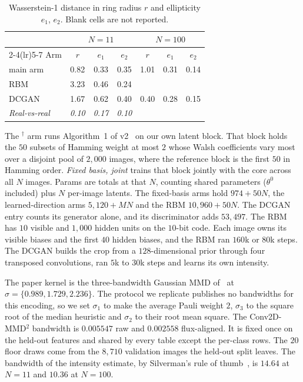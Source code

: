 \documentclass{article}
\begin{document}
\label{app:arms}
\begin{table}
\vspace{-10pt}
\centering
\caption{Wasserstein-1 distance in ring radius $r$ and ellipticity $e_1$, $e_2$. Blank cells
are not reported.}
\label{tab:w1}
\scriptsize
\setlength{\tabcolsep}{3pt}
\begin{tabular}{lcccccc}
\toprule
& \multicolumn{3}{c}{$N = 11$} & \multicolumn{3}{c}{$N = 100$} \\
\cmidrule(lr){2-4}\cmidrule(lr){5-7}
Arm & $r$ & $e_1$ & $e_2$ & $r$ & $e_1$ & $e_2$ \\
\midrule
main arm & 0.82 & 0.33 & 0.35 & 1.01 & 0.31 & 0.14 \\
RBM & 3.23 & 0.46 & 0.24 & & & \\
DCGAN & 1.67 & 0.62 & 0.40 & 0.40 & 0.28 & 0.15 \\
\textit{Real-vs-real} & \textit{0.10} & \textit{0.17} & \textit{0.10} & & & \\
\bottomrule
\end{tabular}
\vspace{-8pt}
\end{table}
The $^{\dagger}$ arm runs Algorithm~1 of v2~\cite{liu_2026_correlation} on our own latent block.
That block holds the $50$ subsets of Hamming weight at most $2$ whose Walsh coefficients vary most
over a disjoint pool of $2{,}000$ images, where the reference block is the first $50$ in Hamming
order. \emph{Fixed basis, joint} trains that block jointly with the core across all $N$ images.
Params are totals at that $N$, counting shared parameters ($\theta^{0}$ included) plus $N$
per-image latents. The fixed-basis arms hold $974 + 50N$, the learned-direction arms
$5{,}120 + MN$ and the RBM $10{,}960 + 50N$. The DCGAN entry counts its generator alone, and its
discriminator adds $53{,}497$. The RBM has $10$ visible and $1{,}000$ hidden units on the $10$-bit
code. Each image owns its visible biases and the first $40$ hidden biases, and the RBM ran $160$k
or $80$k steps. The DCGAN builds the crop from a $128$-dimensional prior through four transposed
convolutions, ran $5$k to $30$k steps and learns its own intensity.

The paper kernel is the three-bandwidth Gaussian MMD of~\cite{recio_2025_train} at
$\sigma = \{0.989, 1.729, 2.236\}$. The protocol we replicate publishes no bandwidths for this
encoding, so we set $\sigma_1$ to make the average Pauli weight $2$, $\sigma_3$ to the square root of
the median heuristic and $\sigma_2$ to their root mean square. The Conv2D-MMD$^2$ bandwidth is
$0.005547$ raw and $0.002558$ flux-aligned. It is fixed once on the held-out features and shared by
every table except the per-class rows. The $20$ floor draws come from the $8{,}710$ validation
images the held-out split leaves. The bandwidth of the intensity estimate, by Silverman's rule of
thumb~\cite{silverman_1986_density}, is $14.64$ at $N{=}11$ and $10.36$ at $N{=}100$.
\end{document}
